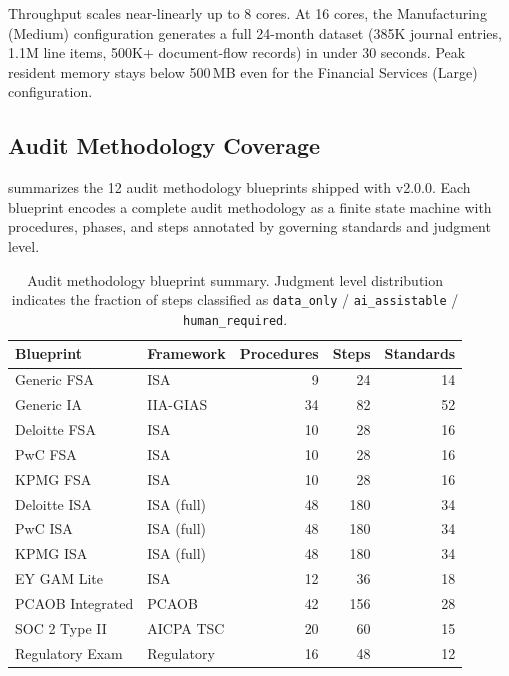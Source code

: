 Throughput scales near-linearly up to 8 cores.  At 16 cores, the
Manufacturing (Medium) configuration generates a full 24-month dataset
(385K journal entries, 1.1M line items, 500K+ document-flow records)
in under 30 seconds.  Peak resident memory stays below 500\,MB even
for the Financial Services (Large) configuration.

\subsection{Audit Methodology Coverage}
\label{sec:exp_audit}

 summarizes the 12 audit methodology
blueprints shipped with \system{} v2.0.0.  Each blueprint encodes a
complete audit methodology as a finite state machine with procedures,
phases, and steps annotated by governing standards and judgment level.

\begin{table}[t]
\centering
\caption{Audit methodology blueprint summary.  Judgment level
  distribution indicates the fraction of steps classified as
  \texttt{data\_only} / \texttt{ai\_assistable} / \texttt{human\_required}.}
\label{tab:blueprint_summary}
\small
\begin{tabular}{llrrr}
\toprule
\textbf{Blueprint} & \textbf{Framework} & \textbf{Procedures}
  & \textbf{Steps} & \textbf{Standards} \\
\midrule
Generic FSA       & ISA         &  9 &  24 & 14 \\
Generic IA        & IIA-GIAS    & 34 &  82 & 52 \\
Deloitte FSA      & ISA         & 10 &  28 & 16 \\
PwC FSA           & ISA         & 10 &  28 & 16 \\
KPMG FSA          & ISA         & 10 &  28 & 16 \\
Deloitte ISA      & ISA (full)  & 48 & 180 & 34 \\
PwC ISA           & ISA (full)  & 48 & 180 & 34 \\
KPMG ISA          & ISA (full)  & 48 & 180 & 34 \\
EY GAM Lite       & ISA         & 12 &  36 & 18 \\
PCAOB Integrated  & PCAOB       & 42 & 156 & 28 \\
SOC 2 Type II     & AICPA TSC   & 20 &  60 & 15 \\
Regulatory Exam   & Regulatory  & 16 &  48 & 12 \\
\bottomrule
\end{tabular}
\end{table}

